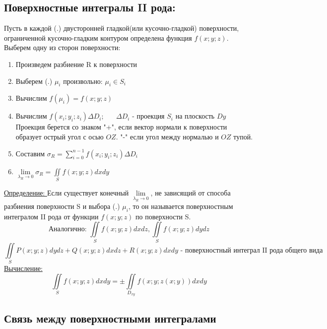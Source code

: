 \documentclass[12pt]{article}
\let\oldiint\iint
\let\oldsum\sum
\let\oldlim\lim
\renewcommand{\iint}{\oldiint\limits}
\renewcommand{\sum}{\oldsum\limits}
\renewcommand{\lim}{\oldlim\limits}
\begin{document}
  \subsection*{Поверхностные интегралы II рода:}
  Пусть в каждой (.) двусторонней гладкой(или кусочно-гладкой) поверхности, ограниченной кусочно-гладким контуром
  определена функция $f(x;y;z)$.\\ Выберем одну из сторон поверхности:
  \begin{enumerate}
    \item Произведем разбиение R к поверхности
    \item Выберем (.) $\mu_i$ произвольно: $\mu_i \in S_i$
    \item Вычислим $f(\mu_i)=f(x;y;z)$
    \item Вычислим $f(x_i;y_i;z_i)\Delta D_i; \hspace{20pt} \Delta D_i$ - проекция $S_i$ на плоскость $Dy$\\
    Проекция берется со знаком "+", если вектор нормали к поверхности образует острый угол с осью $OZ$. "-" если угол
    между нормалью и $OZ$ тупой.
    \item Составим $\sigma_R=\sum_{i=0}^{n-1}f(x_i;y_i;z_i)\Delta D_i$
    \item $\lim_{\lambda_R \to 0}\sigma_R=\iint_S f(x;y;z)dxdy$
  \end{enumerate}
  \underline{Определение: }  Если существует конечный $\lim_{\lambda_R \to 0}$, не зависящий от способа разбиения
  поверхности S и выбора (.) $\mu_i$, то он называется поверхностным интегралом II рода от функции $f(x;y;z)$ по 
  поверхности S.\\
   \[\text{Аналогично: }\iint_S f(x;y;z)dxdz, \iint_S f(x;y;z)dydz\]
  \[\iint_S P(x;y;z)dydz+Q(x;y;z)dxdz+R(x;y;z)dxdy\text{ - поверхностный интеграл II рода общего вида}\]
  \underline{Вычисление: }
  \[\iint_S f(x;y;z)dxdy = \pm \iint_{D_{xy}} f(x;y;z(x;y))dxdy\]
  \subsection{Связь между поверхностными интегралами}
\end{document}
